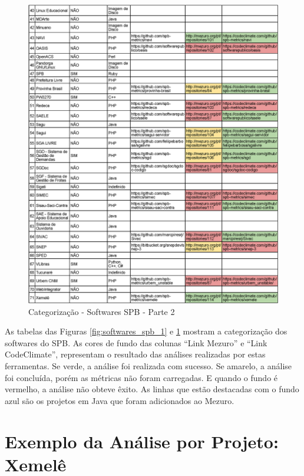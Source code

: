\newpage

\begin{figure}[!htb]
	\centering
    \includegraphics[keepaspectratio=true,scale=0.85]
    {tabelas/spb_2_v2-crop.eps}
  \caption{Categorização - Softwares SPB - Parte 2}
  \label{fig:softwares_spb_2}
\end{figure}

\newpage

As tabelas das Figuras \ref{fig:softwares_spb_1} e \ref{fig:softwares_spb_2}
mostram a categorização dos softwares do SPB.
As cores de fundo das colunas ``Link Mezuro'' e ``Link CodeClimate'',
representam o resultado das análises realizadas por estas ferramentas. Se verde,
a análise foi realizada com sucesso. Se amarelo, a análise foi concluída, porém
as métricas não foram carregadas. E quando o fundo é vermelho, a análise não
obteve êxito. As linhas que estão destacadas com o fundo azul são os projetos em
Java que foram adicionados ao Mezuro.

\section{Exemplo da Análise por Projeto: Xemelê}

